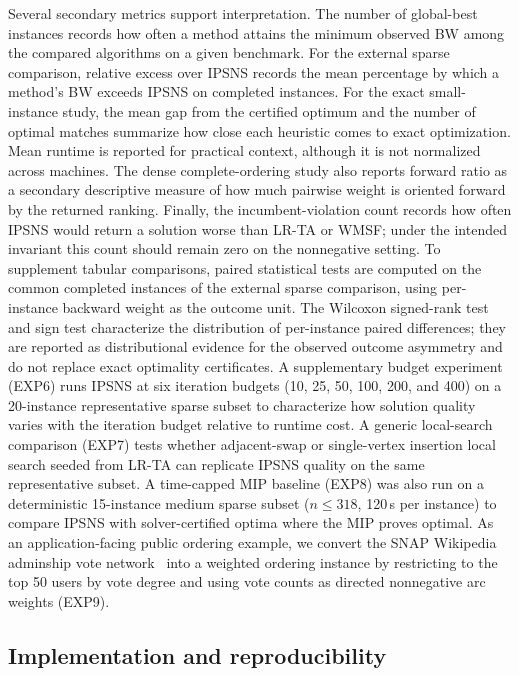 Several secondary metrics support interpretation. The number of global-best instances records how often a method attains the minimum observed BW among the compared algorithms on a given benchmark. For the external sparse comparison, relative excess over IPSNS records the mean percentage by which a method's BW exceeds IPSNS on completed instances. For the exact small-instance study, the mean gap from the certified optimum and the number of optimal matches summarize how close each heuristic comes to exact optimization. Mean runtime is reported for practical context, although it is not normalized across machines. The dense complete-ordering study also reports forward ratio as a secondary descriptive measure of how much pairwise weight is oriented forward by the returned ranking. Finally, the incumbent-violation count records how often IPSNS would return a solution worse than LR-TA or WMSF; under the intended invariant this count should remain zero on the nonnegative setting.
To supplement tabular comparisons, paired statistical tests are computed on the common completed instances of the external sparse comparison, using per-instance backward weight as the outcome unit. The Wilcoxon signed-rank test and sign test characterize the distribution of per-instance paired differences; they are reported as distributional evidence for the observed outcome asymmetry and do not replace exact optimality certificates.
A supplementary budget experiment (EXP6) runs IPSNS at six iteration budgets (10, 25, 50, 100, 200, and 400) on a 20-instance representative sparse subset to characterize how solution quality varies with the iteration budget relative to runtime cost.
A generic local-search comparison (EXP7) tests whether adjacent-swap or single-vertex insertion local search seeded from LR-TA can replicate IPSNS quality on the same representative subset.
A time-capped MIP baseline (EXP8) was also run on a deterministic 15-instance medium sparse subset ($n \le 318$, 120\,s per instance) to compare IPSNS with solver-certified optima where the MIP proves optimal.
As an application-facing public ordering example, we convert the SNAP Wikipedia adminship vote network~\cite{LHK10WikiVote} into a weighted ordering instance by restricting to the top 50 users by vote degree and using vote counts as directed nonnegative arc weights (EXP9).

\subsection{Implementation and reproducibility}

